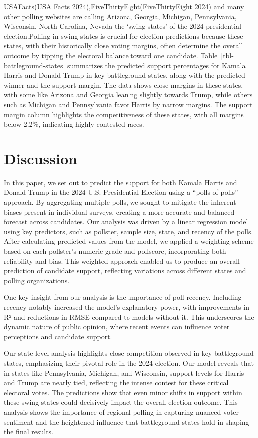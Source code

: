 \documentclass[
  letterpaper,
  DIV=11,
  numbers=noendperiod]{scrartcl}
\begin{document}
USAFacts(USA Facts 2024),FiveThirtyEight(FiveThirtyEight 2024) and many
other polling websites are calling Arizona, Georgia, Michigan,
Pennsylvania, Wisconsin, North Carolina, Nevada the `swing states' of
the 2024 presidential election.Polling in swing states is crucial for
election predictions because these states, with their historically close
voting margins, often determine the overall outcome by tipping the
electoral balance toward one candidate.
Table~\ref{tbl-battleground-states} summarizes the predicted support
percentages for Kamala Harris and Donald Trump in key battleground
states, along with the predicted winner and the support margin. The data
shows close margins in these states, with some like Arizona and Georgia
leaning slightly towards Trump, while others such as Michigan and
Pennsylvania favor Harris by narrow margins. The support margin column
highlights the competitiveness of these states, with all margins below
2.2\%, indicating highly contested races.

\hypertarget{sec-discussion}{%
\section{Discussion}\label{sec-discussion}}

In this paper, we set out to predict the support for both Kamala Harris
and Donald Trump in the 2024 U.S. Presidential Election using a
``polls-of-polls'' approach. By aggregating multiple polls, we sought to
mitigate the inherent biases present in individual surveys, creating a
more accurate and balanced forecast across candidates. Our analysis was
driven by a linear regression model using key predictors, such as
pollster, sample size, state, and recency of the polls. After
calculating predicted values from the model, we applied a weighting
scheme based on each pollster's numeric grade and pollscore,
incorporating both reliability and bias. This weighted approach enabled
us to produce an overall prediction of candidate support, reflecting
variations across different states and polling organizations.

One key insight from our analysis is the importance of poll recency.
Including recency notably increased the model's explanatory power, with
improvements in R² and reductions in RMSE compared to models without it.
This underscores the dynamic nature of public opinion, where recent
events can influence voter perceptions and candidate support.

Our state-level analysis highlights close competition observed in key
battleground states, emphasizing their pivotal role in the 2024
election. Our model reveals that in states like Pennsylvania, Michigan,
and Wisconsin, support levels for Harris and Trump are nearly tied,
reflecting the intense contest for these critical electoral votes. The
predictions show that even minor shifts in support within these swing
states could decisively impact the overall election outcome. This
analysis shows the importance of regional polling in capturing nuanced
voter sentiment and the heightened influence that battleground states
hold in shaping the final results.
\end{document}
